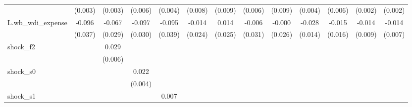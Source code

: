 {\begin{tabular}{l*{12}{c}}
            &     (0.003)         &     (0.003)         &     (0.006)         &     (0.004)         &     (0.008)         &     (0.009)         &     (0.006)         &     (0.009)         &     (0.004)         &     (0.006)         &     (0.002)         &     (0.002)         \\
\addlinespace
L.wb\_wdi\_expense&      -0.096\sym{**} &      -0.067\sym{**} &      -0.097\sym{***}&      -0.095\sym{**} &      -0.014         &       0.014         &      -0.006         &      -0.000         &      -0.028\sym{*}  &      -0.015         &      -0.014         &      -0.014\sym{**} \\
            &     (0.037)         &     (0.029)         &     (0.030)         &     (0.039)         &     (0.024)         &     (0.025)         &     (0.031)         &     (0.026)         &     (0.014)         &     (0.016)         &     (0.009)         &     (0.007)         \\
\addlinespace
shock\_f2    &                     &       0.029\sym{***}&                     &                     &                     &                     &                     &                     &                     &                     &                     &                     \\
            &                     &     (0.006)         &                     &                     &                     &                     &                     &                     &                     &                     &                     &                     \\
\addlinespace
shock\_s0    &                     &                     &       0.022\sym{***}&                     &                     &                     &                     &                     &                     &                     &                     &                     \\
            &                     &                     &     (0.004)         &                     &                     &                     &                     &                     &                     &                     &                     &                     \\
\addlinespace
shock\_s1    &                     &                     &                     &       0.007\sym{**} &                     &                     &                     &                     &                     &                     &                     &                     \\

\end{tabular}}
